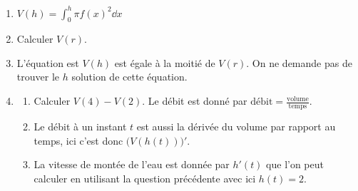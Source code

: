 \documentclass[11pt,class=report,crop=false]{standalone}
\begin{document}
\indication
\sauteligne
\begin{enumerate}
\item $V(h) = \int_0^h \pi f(x)^2 \dd x$
\item Calculer $V(r)$.
\item L'équation est \og{}$V(h)$ est égale à la moitié de $V(r)$\fg{}. On ne demande pas de trouver le $h$ solution de cette équation.
\item 
\begin{enumerate}
	\item Calculer $V(4)-V(2)$. Le débit est donné par $\text{débit} = \frac{\text{volume}}{\text{temps}}$.
	\item Le débit à un instant $t$ est aussi la dérivée du volume par rapport au temps, ici c'est donc $\big( V(h(t)) \big) '$.
	\item La vitesse de montée de l'eau est donnée par $h'(t)$ que l'on peut calculer en utilisant la question précédente avec ici $h(t)=2$.
\end{enumerate}
\end{enumerate}
	

\finindication

\correction

\end{document}

